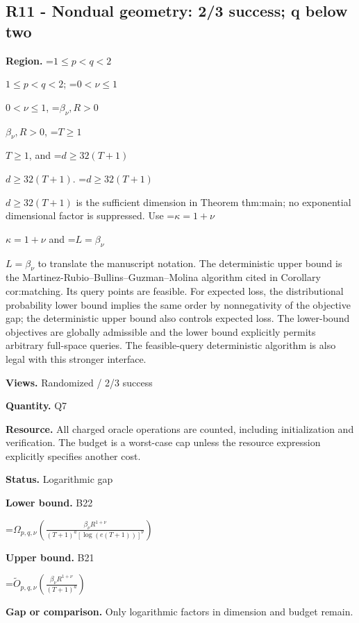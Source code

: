 \documentclass[10pt,a4paper]{article}
\newcommand{\AtlasMath}[1]{\par\begingroup\centering\setbox0=\hbox{$\displaystyle #1$}\ifdim\wd0>1.4\linewidth\typeout{ATLAS WIDE FORMULA: \the\wd0}\fi\ifdim\wd0>\linewidth\resizebox{\linewidth}{!}{\box0}\else\box0\fi\par\endgroup}
\newcommand{\AtlasInlineMath}[1]{\begingroup\setbox0=\hbox{$#1$}\ifdim\wd0>.4\linewidth\endgroup\AtlasMath{#1}\else\endgroup$#1$\fi}
\begin{document}
\subsection{R11 - Nondual geometry: 2/3 success; q below two}


\textbf{Region.} \AtlasInlineMath{1\le p<q<2}; \AtlasInlineMath{0<\nu\le1}, \AtlasInlineMath{\beta_\nu,R>0}, \AtlasInlineMath{T\ge1}, and \AtlasInlineMath{d\ge32(T+1)}. \AtlasInlineMath{d\ge32(T+1)} is the sufficient dimension in Theorem thm:main; no exponential dimensional factor is suppressed. Use \AtlasInlineMath{\kappa=1+\nu} and \AtlasInlineMath{L=\beta_\nu} to translate the manuscript notation. The deterministic upper bound is the Martinez-Rubio--Bullins--Guzman--Molina algorithm cited in Corollary cor:matching. Its query points are feasible. For expected loss, the distributional probability lower bound implies the same order by nonnegativity of the objective gap; the deterministic upper bound also controls expected loss. The lower-bound objectives are globally admissible and the lower bound explicitly permits arbitrary full-space queries. The feasible-query deterministic algorithm is also legal with this stronger interface.



\textbf{Views.} Randomized / 2/3 success



\textbf{Quantity.} Q7



\textbf{Resource.} All charged oracle operations are counted, including initialization and verification. The budget is a worst-case cap unless the resource expression explicitly specifies another cost.



\textbf{Status.} Logarithmic gap



\textbf{Lower bound.} B22



\AtlasMath{\Omega_{p,q,\nu}\!\left(\frac{\beta_\nu R^{1+\nu}}{(T+1)^a[\log(e(T+1))]^\nu}\right)}


\textbf{Upper bound.} B21



\AtlasMath{\widetilde O_{p,q,\nu}\!\left(\frac{\beta_\nu R^{1+\nu}}{(T+1)^a}\right)}


\textbf{Gap or comparison.} Only logarithmic factors in dimension and budget remain.
\end{document}
